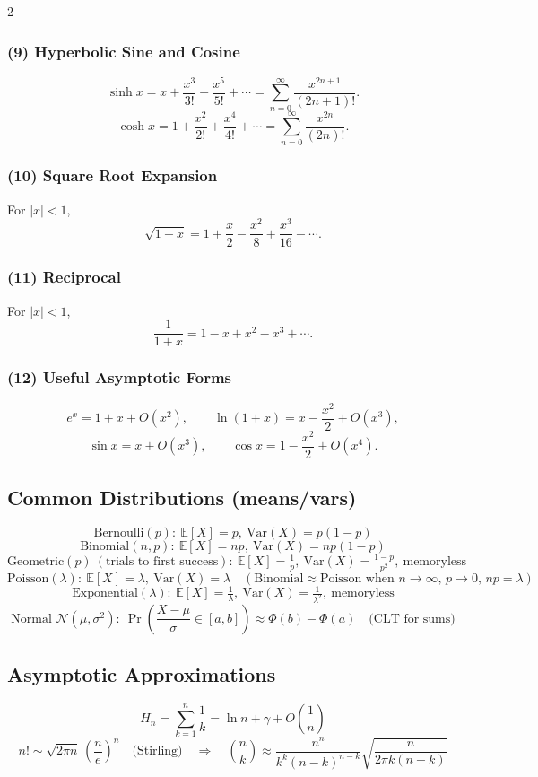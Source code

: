 \documentclass[10pt]{article}
\theoremstyle{definition}
\begin{document}
\begin{multicols*}{2}
\subsubsection*{(9) Hyperbolic Sine and Cosine}
\[
\sinh x = x + \frac{x^3}{3!} + \frac{x^5}{5!} + \cdots
= \sum_{n=0}^\infty \frac{x^{2n+1}}{(2n+1)!}.
\]
\[
\cosh x = 1 + \frac{x^2}{2!} + \frac{x^4}{4!} + \cdots
= \sum_{n=0}^\infty \frac{x^{2n}}{(2n)!}.
\]

\subsubsection*{(10) Square Root Expansion}
For \(|x|<1\),
\[
\sqrt{1+x}
    = 1 + \frac{x}{2} - \frac{x^2}{8} + \frac{x^3}{16} - \cdots.
\]

\subsubsection*{(11) Reciprocal}
For \(|x|<1\),
\[
\frac{1}{1+x}
    = 1 - x + x^2 - x^3 + \cdots.
\]

\subsubsection*{(12) Useful Asymptotic Forms}
\[
e^x = 1 + x + O(x^2), \qquad
\ln(1+x) = x - \frac{x^2}{2} + O(x^3),
\]
\[
\sin x = x + O(x^3), \qquad
\cos x = 1 - \frac{x^2}{2} + O(x^4).
\]

\subsection{Common Distributions (means/vars)}
\[
\text{Bernoulli}(p):\ \mathbb{E}[X]=p,\ \mathrm{Var}(X)=p(1-p)
\]
\[
\text{Binomial}(n,p):\ \mathbb{E}[X]=np,\ \mathrm{Var}(X)=np(1-p)
\]
\[
\text{Geometric}(p)\ (\text{trials to first success}):\ \mathbb{E}[X]=\tfrac{1}{p},\ \mathrm{Var}(X)=\tfrac{1-p}{p^2},\ \text{memoryless}
\]
\[
\text{Poisson}(\lambda):\ \mathbb{E}[X]=\lambda,\ \mathrm{Var}(X)=\lambda\quad(\text{Binomial}\approx\text{Poisson when }n\to\infty,\,p\to0,\,np=\lambda)
\]
\[
\text{Exponential}(\lambda):\ \mathbb{E}[X]=\tfrac{1}{\lambda},\ \mathrm{Var}(X)=\tfrac{1}{\lambda^2},\ \text{memoryless}
\]
\[
\text{Normal } \mathcal{N}(\mu,\sigma^2):\ \Pr\left(\frac{X-\mu}{\sigma}\in[a,b]\right)\approx \Phi(b)-\Phi(a)\quad\text{(CLT for sums)}
\]

\subsection{Asymptotic Approximations}
\[
H_n=\sum_{k=1}^n \frac{1}{k}=\ln n+\gamma+O\!\left(\frac{1}{n}\right)
\]
\[
n!\sim \sqrt{2\pi n}\,\left(\frac{n}{e}\right)^n\quad\text{(Stirling)}\quad\Rightarrow\quad \binom{n}{k}\approx \frac{n^n}{k^k(n-k)^{n-k}}\sqrt{\frac{n}{2\pi k(n-k)}}
\]


\end{multicols*}
\end{document}
